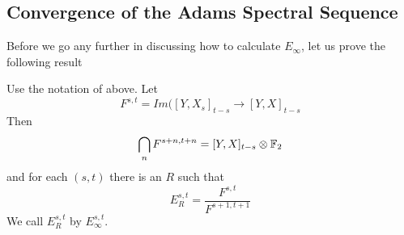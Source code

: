 \subsection{Convergence of the Adams Spectral Sequence}

Before we go any further in discussing how to calculate $E_\infty$, let us prove the following result
\begin{Theorem}
  Use the notation of above.  Let 
  \[F^{s,t}=Im([Y,X_s]_{t-s}\to [Y,X]_{t-s}\]
  Then 
  \[\bigcap_n F^{s+n,t+n}=[Y,X]_{t-s}\otimes \mathbb{F}_2\]
  and for each $(s,t)$ there is an $R$ such that
  \[E_R^{s,t}=\frac{F^{s,t}}{F^{s+1,t+1}}\]
  We call $E_R^{s,t}$ by $E_\infty^{s,t}$.  
\end{Theorem}


